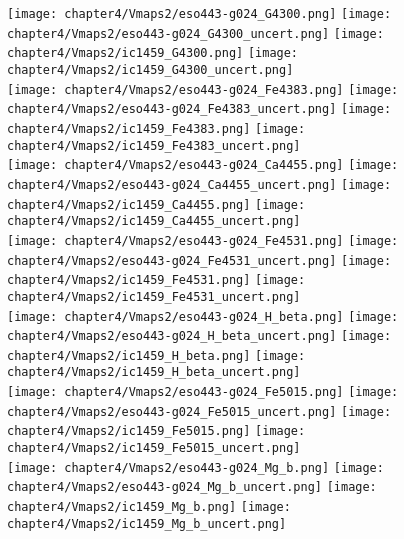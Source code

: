\begin{figure*}
	\centering
	\texttt{[image: chapter4/Vmaps2/eso443-g024\_G4300.png]}
	\texttt{[image: chapter4/Vmaps2/eso443-g024\_G4300\_uncert.png]}
	\texttt{[image: chapter4/Vmaps2/ic1459\_G4300.png]}
	\texttt{[image: chapter4/Vmaps2/ic1459\_G4300\_uncert.png]}
	\\
	\texttt{[image: chapter4/Vmaps2/eso443-g024\_Fe4383.png]}
	\texttt{[image: chapter4/Vmaps2/eso443-g024\_Fe4383\_uncert.png]}
	\texttt{[image: chapter4/Vmaps2/ic1459\_Fe4383.png]}
	\texttt{[image: chapter4/Vmaps2/ic1459\_Fe4383\_uncert.png]}
	\\
	\texttt{[image: chapter4/Vmaps2/eso443-g024\_Ca4455.png]}
	\texttt{[image: chapter4/Vmaps2/eso443-g024\_Ca4455\_uncert.png]}
	\texttt{[image: chapter4/Vmaps2/ic1459\_Ca4455.png]}
	\texttt{[image: chapter4/Vmaps2/ic1459\_Ca4455\_uncert.png]}
	\\
	\texttt{[image: chapter4/Vmaps2/eso443-g024\_Fe4531.png]}
	\texttt{[image: chapter4/Vmaps2/eso443-g024\_Fe4531\_uncert.png]}
	\texttt{[image: chapter4/Vmaps2/ic1459\_Fe4531.png]}
	\texttt{[image: chapter4/Vmaps2/ic1459\_Fe4531\_uncert.png]}
	\\
	\texttt{[image: chapter4/Vmaps2/eso443-g024\_H\_beta.png]}
	\texttt{[image: chapter4/Vmaps2/eso443-g024\_H\_beta\_uncert.png]}
	\texttt{[image: chapter4/Vmaps2/ic1459\_H\_beta.png]}
	\texttt{[image: chapter4/Vmaps2/ic1459\_H\_beta\_uncert.png]}
	\\
	\texttt{[image: chapter4/Vmaps2/eso443-g024\_Fe5015.png]}
	\texttt{[image: chapter4/Vmaps2/eso443-g024\_Fe5015\_uncert.png]}
	\texttt{[image: chapter4/Vmaps2/ic1459\_Fe5015.png]}
	\texttt{[image: chapter4/Vmaps2/ic1459\_Fe5015\_uncert.png]}
	\\
	\texttt{[image: chapter4/Vmaps2/eso443-g024\_Mg\_b.png]}
	\texttt{[image: chapter4/Vmaps2/eso443-g024\_Mg\_b\_uncert.png]}
	\texttt{[image: chapter4/Vmaps2/ic1459\_Mg\_b.png]}
	\texttt{[image: chapter4/Vmaps2/ic1459\_Mg\_b\_uncert.png]}
	\\
	\caption[VIMOS absorption line strength maps]{VIMOS stellar kinematic maps: From left to right: ESO443-G024, ESO443-G024 uncertianties, IC1459 and IC1459 uncertainties. From top to bottom: G4300, Fe4383, Ca4455, Fe4531, H$_\beta$, Fe5015, Mg$_b$. Plots are as in \ref{fig:VIMOS_absorption}}
	\label{fig:VIMOS_absorption}
\end{figure*}


